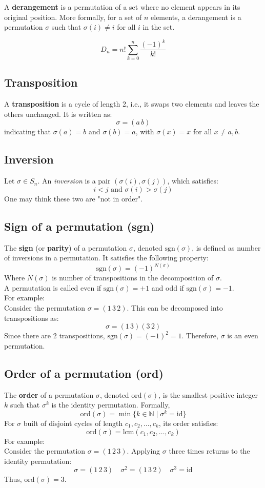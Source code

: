 \documentclass{article}
\begin{document}
A \textbf{derangement} is a permutation of a set where no element appears in its original position. More formally, for a set of \( n \) elements, a derangement is a permutation \( \sigma \) such that \( \sigma(i) \neq i \) for all \( i \) in the set.

\[
D_n = n! \sum_{k=0}^{n} \frac{(-1)^k}{k!}
\]

\subsection{Transposition}
A \textbf{transposition} is a cycle of length 2, i.e., it swaps two elements and leaves the others unchanged. It is written as:
\[
\sigma = (a \, b)
\]
indicating that \(\sigma(a) = b\) and \(\sigma(b) = a\), with \(\sigma(x) = x\) for all \(x \ne a, b\).

\subsection{Inversion}

Let \(\sigma\in S_n\). An \textit{inversion} is a pair \((\sigma(i),\sigma(j))\), which satisfies:
\[i < j \text{ and } \sigma(i) > \sigma(j) \]
One may think these two are "not in order".

\subsection{Sign of a permutation (sgn)}
The \textbf{sign} (or \textbf{parity}) of a permutation \(\sigma\), denoted \(\text{sgn}(\sigma)\), is defined as number of inversions in a permutation. It satisfies the following property:
\[
\text{sgn}(\sigma) = (-1)^{N(\sigma)}
\]
Where \(N(\sigma)\) is number of transpositions in the decomposition of \(\sigma\).\\
A permutation is called even if \(\text{sgn}(\sigma) = +1\) and odd if \(\text{sgn}(\sigma) = -1\).\\
For example:\\
Consider the permutation \(\sigma = (1\, 3\, 2)\). This can be decomposed into transpositions as:
\[
\sigma = (1\, 3)(3\, 2)
\]
Since there are 2 transpositions, \(\text{sgn}(\sigma) = (-1)^2 = 1\). Therefore, \(\sigma\) is an even permutation.

\subsection{Order of a permutation (ord)}
The \textbf{order} of a permutation \(\sigma\), denoted \(\text{ord}(\sigma)\), is the smallest positive integer \(k\) such that \(\sigma^k\) is the identity permutation. Formally,
\[
\text{ord}(\sigma) = \min \{ k \in \mathbb{N} \mid \sigma^k = \text{id} \}
\]
For \(\sigma\) built of disjoint cycles of length \(c_1,c_2,\dots,c_k\), its order satisfies:
\[\text{ord}(\sigma)=\text{lcm}(c_1,c_2,\dots,c_k)\]
For example:\\
Consider the permutation \(\sigma = (1\, 2\, 3)\). Applying \(\sigma\) three times returns to the identity permutation:
\[
\sigma = (1\, 2\, 3) \quad \sigma^2 = (1\, 3\, 2) \quad \sigma^3 = \text{id}
\]
Thus, \(\text{ord}(\sigma) = 3\).
\end{document}
